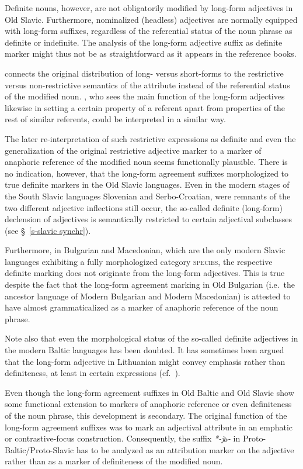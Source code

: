 Definite nouns, however, are not obligatorily modified by long-form adjectives in Old Slavic. Furthermore, nominalized (headless) adjectives are normally equipped with long-form suffixes, regardless of the referential status of the noun phrase as definite or indefinite. The analysis of the long-form adjective suffix as definite marker might thus not be as straightforward as it appears in the reference books. 

\citet[214–215]{mendoza2004} connects the original distribution of long- versus short-forms to the restrictive versus non-restrictive semantics of the attribute instead of the referential status of the modified noun. \citet{tolstoj1957}, who sees the main function of the long-form adjectives likewise in setting a certain property of a referent apart from properties of the rest of similar referents, could be interpreted in a similar way.

The later re-interpretation of such restrictive expressions as definite and even the generalization of the original restrictive adjective marker to a marker of anaphoric reference of the modified noun seems functionally plausible. There is no indication, however, that the long-form agreement suffixes morphologized to true definite markers in the Old Slavic languages. Even in the modern stages of the South Slavic languages Slovenian and Serbo-Croatian, were remnants of the two different adjective inflections still occur, the so-called definite (long-form) declension of adjectives is semantically restricted to certain adjectival subclasses (see \S~\ref{s-slavic synchr}). 

Furthermore, in Bulgarian and Macedonian, which are the only modern Slavic languages exhibiting a fully morphologized category \textsc{species}, the respective definite marking does not originate from the long-form adjectives. This is true despite the fact that the long-form agreement marking in Old Bulgarian (i.e.~the ancestor language of Modern Bulgarian and Modern Macedonian) is attested to have almost grammaticalized as a marker of anaphoric reference of the noun phrase.

Note also that even the morphological status of the so-called definite adjectives in the modern Baltic languages has been doubted. It has sometimes been argued that the long-form adjective in Lithuanian might convey emphasis rather than definiteness, at least in certain expressions (cf.~\citealt[181–182]{kramsky1972}).

Even though the long-form agreement suffixes in Old Baltic and Old Slavic show some functional extension to markers of anaphoric reference or even definiteness of the noun phrase, this development is secondary. The original function of the long-form agreement suffixes was to mark an adjectival attribute in an emphatic or contrastive-focus construction. Consequently, the suffix \textit{*-jь-} in Proto-Baltic/Proto-Slavic has to be analyzed as an attribution marker on the adjective rather than as a marker of definiteness of the modified noun.

